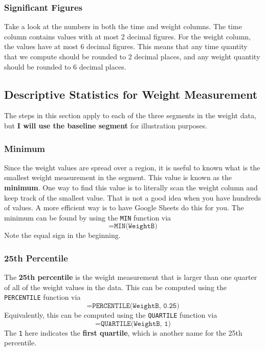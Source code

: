 \subsubsection{Significant Figures}
Take a look at the numbers in both the time and weight columns. The time column contains values with at most 2 decimal figures. For the weight column, the values have at most 6 decimal figures. This means that any time quantity that we compute should be rounded to 2 decimal places, and any weight quantity should be rounded to 6 decimal places.
\subsection{Descriptive Statistics for Weight Measurement}
The steps in this section apply to each of the three segments in the weight data, but \textbf{I will use the baseline segment} for illustration purposes.
\subsubsection{Minimum}
Since the weight values are spread over a region, it is useful to known what is the smallest weight measurement in the segment. This value is known as the \textbf{minimum}. One way to find this value is to literally scan the weight column and keep track of the smallest value. That is not a good idea when you have hundreds of values. A more efficient way is to have Google Sheets do this for you. The minimum can be found by using the \texttt{MIN} function via
\begin{equation}
    \texttt{=MIN(WeightB)}
\end{equation}
Note the equal sign in the beginning.
\subsubsection{25th Percentile}
The \textbf{25th percentile} is the weight measurement that is larger than one quarter of all of the weight values in the data. This can be computed using the \texttt{PERCENTILE} function via
\begin{equation}
    \texttt{=PERCENTILE(WeightB, 0.25)}
\end{equation}
Equivalently, this can be computed using the \texttt{QUARTILE} function via
\begin{equation}
    \texttt{=QUARTILE(WeightB, 1)}
\end{equation}
The \texttt{1} here indicates the \textbf{first quartile}, which is another name for the 25th percentile.
